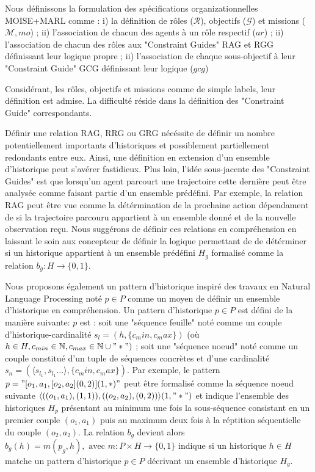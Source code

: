 \documentclass[sigconf,anonymous]{aamas}
\begin{document}
\noindent Nous définissons la formulation des spécifications organizationnelles MOISE+MARL comme : \quad i) la définition de rôles ($\mathcal{R}$), objectifs ($\mathcal{G}$) et missions ($\mathcal{M}, mo$) ; ii) l'association de chacun des agents à un rôle respectif ($ar$) ; \quad ii) l'association de chacun des rôles aux "Constraint Guides" RAG et RGG définissant leur logique propre ; ii) l'association de chaque sous-objectif à leur "Constraint Guide" GCG définissant leur logique ($gcg$)

Considérant, les rôles, objectifs et missions comme de simple labels, leur définition est admise. La difficulté réside dans la définition des "Constraint Guide" correspondants.

Définir une relation RAG, RRG ou GRG nécéssite de définir un nombre potentiellement importants d'historiques et possiblement partiellement redondants entre eux. Ainsi, une définition en extension d'un ensemble d'historique peut s'avérer fastidieux. Plus loin, l'idée sous-jacente des "Constraint Guides" est que lorsqu'un agent parcourt une trajectoire cette dernière peut être analysée comme faisant partie d'un ensemble prédéfini. Par exemple, la relation RAG peut être vue comme la détérmination de la prochaine action dépendament de si la trajectoire parcouru appartient à un ensemble donné et de la nouvelle observation reçu. Nous suggérons de définir ces relations en compréhension en laissant le soin aux concepteur de définir la logique permettant de de détérminer si un historique appartient à un ensemble prédéfini $H_g$ formalisé comme la relation $b_g: H \to \{0,1\}$.

Nous proposons également un pattern d'historique inspiré des travaux en Natural Language Processing noté $p \in P$ comme un moyen de définir un ensemble d'historique en compréhension. Un pattern d'historique $p \in P$ est défini de la manière suivante: $p$ est : soit une "séquence feuille" noté comme un couple d'historique-cardinalité $s_l = (h, \{c_min,c_max\})$ (où $h \in H, c_{min} \in \mathbb{N}, c_{max} \in \mathbb{N} \cup "*")$ ; soit une "séquence noeud" noté comme un couple constitué d'un tuple de séquences concrètes et  d'une cardinalité $s_n = (\langle s_{l_1}, s_{l_1}\dots \rangle, \{c_min,c_max\})$. Par exemple, le pattern $p = \allowbreak "[o_1,a_1,[o_2,a_2](0,2)](1,*)"$ peut être formalisé comme la séquence noeud suivante $\allowbreak \langle ((o_1,a_1),(1,1)), ((o_2,a_2),(0,2))\rangle(1,"*")$ et indique l'ensemble des historiques $H_p$ présentant au minimum une fois la sous-séquence consistant en un premier couple $(o_1,a_1)$ puis au maximum deux fois à la réptition séquentielle du couple $(o_2,a_2)$.
La relation $b_g$ devient alors $b_g(h) = m(p_g,h), \text{ avec } m: P \times H \to \{0,1\}$ indique si un historique $h \in H$ matche un pattern d'historique $p \in P$ décrivant un ensemble d'historique $H_g$.
\end{document}
